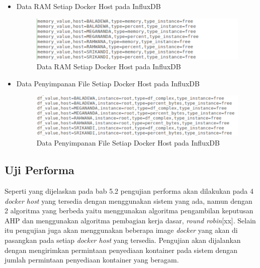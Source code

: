 \begin{itemize}
\item Data RAM Setiap Docker Host pada InfluxDB
\begin{figure}[H]
        \centering
        \includegraphics[width=\linewidth]{images/bab5/dataram}
        \caption{Data RAM Setiap Docker Host pada InfluxDB}
        \label{DataRam}
      \end{figure} 
\end{itemize}
\begin{itemize}
\item Data Penyimpanan File Setiap Docker Host pada InfluxDB
\begin{figure}[H]
        \centering
        \includegraphics[width=\linewidth]{images/bab5/datadf}
        \caption{Data Penyimpanan File Setiap Docker Host pada InfluxDB}
        \label{DataDf}
      \end{figure} 
\end{itemize}


      \subsection{Uji Performa}
 Seperti yang dijelaskan pada bab 5.2 pengujian performa akan dilakukan pada 4 \textit{docker host} yang tersedia dengan menggunakan sistem yang ada, namun dengan 2 algoritma yang berbeda yaitu menggunakan algoritma pengambilan keputusan AHP dan menggunakan algoritma pembagian kerja dasar, \textit{round robin}[xx]. Selain itu pengujian juga akan menggunakan beberapa image \textit{docker} yang akan di pasangkan pada setiap \textit{docker host} yang tersedia. Pengujian akan dijalankan dengan mengirimkan permintaan penyediaan kontainer pada sistem dengan jumlah permintaan penyediaan kontainer yang beragam.

